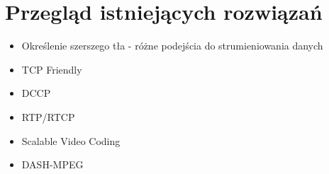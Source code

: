 \chapter{Przegląd istniejących rozwiązań}
\label{cha:rozdzial2}

\begin{itemize}
\item Określenie szerszego tła - różne podejścia do strumieniowania danych 
\item TCP Friendly
\item DCCP
\item RTP/RTCP
\item Scalable Video Coding
\item DASH-MPEG
\end{itemize}